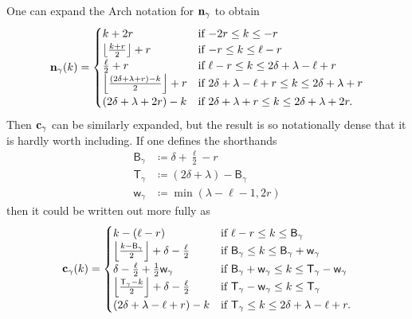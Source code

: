 \begin{remark}
  One can expand the Arch notation for $\mathbf n_\gamma$ to obtain
  \[
    \mathbf n_\gamma(k) =
    \begin{cases}
      k + 2r & \text{if } {-2r} \le k \le -r \\
      \left\lfloor \frac{k+r}{2} \right\rfloor + r & \text{if }{-r} \le k \le \ell-r \\
      \frac{\ell}{2} + r & \text{if } \ell - r \le k \le 2\delta + \lambda - \ell + r \\
      \left\lfloor \frac{(2\delta+\lambda+r)-k}{2} \right\rfloor + r & \text{if } 2\delta + \lambda - \ell + r \le k \le 2\delta + \lambda + r \\
      (2\delta + \lambda + 2r) - k & \text{if } 2\delta + \lambda + r \le k \le 2\delta + \lambda + 2r.
    \end{cases}
  \]
  Then $\mathbf c_\gamma$ can be similarly expanded, but the result is so notationally dense
  that it is hardly worth including.
  If one defines the shorthands
  \begin{align*}
    \mathsf{B}_\gamma &\coloneqq \delta + \frac{\ell}{2} - r \\
    \mathsf{T}_\gamma &\coloneqq (2\delta+\lambda) - \mathsf{B}_\gamma \\
    \mathsf{w}_\gamma &\coloneqq \min(\lambda-\ell-1, 2r)
  \end{align*}
  then it could be written out more fully as
  \[
    \mathbf c_\gamma(k)
    =
    \begin{cases}
      k - (\ell - r)
        & \text{if } \ell-r \le k \le \mathsf{B}_\gamma \\
      \left\lfloor \frac{k - \mathsf{B}_\gamma}{2} \right\rfloor + \delta - \frac{\ell}{2}
        &\text{if } \mathsf{B}_\gamma \le k \le \mathsf{B}_\gamma + \mathsf{w}_\gamma \\
      \delta - \frac{\ell}{2} + \frac{1}{2} \mathsf{w}_\gamma
        &\text{if } \mathsf{B}_\gamma + \mathsf{w}_\gamma \le k \le \mathsf{T}_\gamma - \mathsf{w}_\gamma \\
      \left\lfloor \frac{\mathsf{T}_\gamma - k}{2} \right\rfloor + \delta - \frac{\ell}{2}
        &\text{if } \mathsf{T}_\gamma - \mathsf{w}_\gamma \le k \le \mathsf{T}_\gamma \\
        (2\delta + \lambda - \ell + r) - k
        & \text{if } \mathsf{T}_\gamma \le k \le 2\delta + \lambda - \ell + r.
    \end{cases}
  \]
\end{remark}

